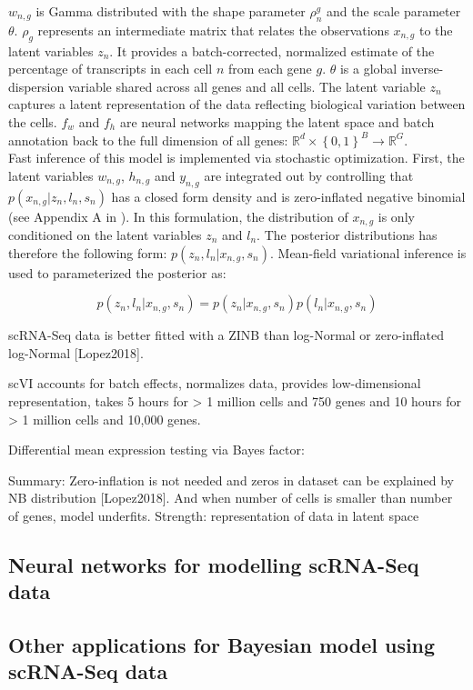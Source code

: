$w_{n,g}$ is Gamma distributed with the shape parameter $\rho_n^g$ and the scale parameter $\theta$. $\rho_g$ represents an intermediate matrix that relates the observations $x_{n,g}$ to the latent variables $z_n$. It provides a batch-corrected, normalized estimate of the percentage of transcripts in each cell $n$ from each gene $g$. $\theta$ is a global inverse-dispersion variable shared across all genes and all cells. The latent variable $z_n$ captures a latent representation of the data reflecting biological variation between the cells. $f_w$ and $f_h$ are neural networks mapping the latent space and batch annotation back to the full dimension of all genes: $\mathbb{R}^d\times{}\left\lbrace0,1\right\rbrace^B\rightarrow\mathbb{R}^G$.\\

Fast inference of this model is implemented via stochastic optimization. First, the latent variables $w_{n,g}$, $h_{n,g}$ and $y_{n,g}$ are integrated out by controlling that $p(x_{n,g}|z_n,l_n,s_n)$ has a closed form density and is zero-inflated negative binomial (see Appendix A in \citep{Lopez2018}). In this formulation, the distribution of $x_{n,g}$ is only conditioned on the latent variables $z_n$ and $l_n$. The posterior distributions has therefore the following form: $p(z_n,l_n|x_{n,g},s_n)$. Mean-field variational inference is used to parameterized the posterior as:

\begin{equation}
p(z_n,l_n|x_{n,g},s_n)=p(z_n|x_{n,g},s_n)p(l_n|x_{n,g},s_n)
\end{equation} 






scRNA-Seq data is better fitted with a ZINB than log-Normal or zero-inflated log-Normal [Lopez2018]. 

scVI accounts for batch effects, normalizes data, provides low-dimensional representation, takes 5 hours for > 1 million cells and 750 genes and 10 hours for > 1 million cells and 10,000 genes.

Differential mean expression testing via Bayes factor:



Summary: Zero-inflation is not needed and zeros in dataset can be explained by NB distribution [Lopez2018]. And when number of cells is smaller than number of genes, model underfits. Strength: representation of data in latent space


\subsection{Neural networks for modelling scRNA-Seq data}

\subsection{Other applications for Bayesian model using scRNA-Seq data}
 

